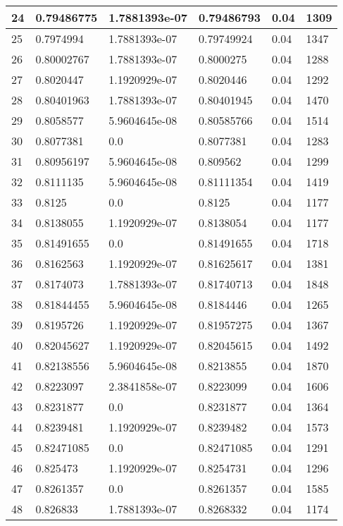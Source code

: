 \begin{longtable}{|l|l|l|l|l|l|}
24 & 0.79486775 & 1.7881393e-07 & 0.79486793 & 0.04 & 1309 \\ \hline 
25 & 0.7974994 & 1.7881393e-07 & 0.79749924 & 0.04 & 1347 \\ \hline 
26 & 0.80002767 & 1.7881393e-07 & 0.8000275 & 0.04 & 1288 \\ \hline 
27 & 0.8020447 & 1.1920929e-07 & 0.8020446 & 0.04 & 1292 \\ \hline 
28 & 0.80401963 & 1.7881393e-07 & 0.80401945 & 0.04 & 1470 \\ \hline 
29 & 0.8058577 & 5.9604645e-08 & 0.80585766 & 0.04 & 1514 \\ \hline 
30 & 0.8077381 & 0.0 & 0.8077381 & 0.04 & 1283 \\ \hline 
31 & 0.80956197 & 5.9604645e-08 & 0.809562 & 0.04 & 1299 \\ \hline 
32 & 0.8111135 & 5.9604645e-08 & 0.81111354 & 0.04 & 1419 \\ \hline 
33 & 0.8125 & 0.0 & 0.8125 & 0.04 & 1177 \\ \hline 
34 & 0.8138055 & 1.1920929e-07 & 0.8138054 & 0.04 & 1177 \\ \hline 
35 & 0.81491655 & 0.0 & 0.81491655 & 0.04 & 1718 \\ \hline 
36 & 0.8162563 & 1.1920929e-07 & 0.81625617 & 0.04 & 1381 \\ \hline 
37 & 0.8174073 & 1.7881393e-07 & 0.81740713 & 0.04 & 1848 \\ \hline 
38 & 0.81844455 & 5.9604645e-08 & 0.8184446 & 0.04 & 1265 \\ \hline 
39 & 0.8195726 & 1.1920929e-07 & 0.81957275 & 0.04 & 1367 \\ \hline 
40 & 0.82045627 & 1.1920929e-07 & 0.82045615 & 0.04 & 1492 \\ \hline 
41 & 0.82138556 & 5.9604645e-08 & 0.8213855 & 0.04 & 1870 \\ \hline 
42 & 0.8223097 & 2.3841858e-07 & 0.8223099 & 0.04 & 1606 \\ \hline 
43 & 0.8231877 & 0.0 & 0.8231877 & 0.04 & 1364 \\ \hline 
44 & 0.8239481 & 1.1920929e-07 & 0.8239482 & 0.04 & 1573 \\ \hline 
45 & 0.82471085 & 0.0 & 0.82471085 & 0.04 & 1291 \\ \hline 
46 & 0.825473 & 1.1920929e-07 & 0.8254731 & 0.04 & 1296 \\ \hline 
47 & 0.8261357 & 0.0 & 0.8261357 & 0.04 & 1585 \\ \hline 
48 & 0.826833 & 1.7881393e-07 & 0.8268332 & 0.04 & 1174 \\ \hline 

\end{longtable}
